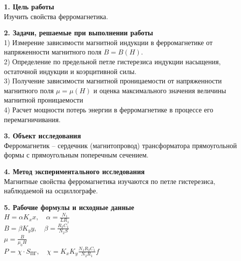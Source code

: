 \documentclass[12pt,fleqn]{article}
\begin{document}
\begin{justify}
    \textbf{1. Цель работы} \\
    Изучить свойства ферромагнетика. \\
\end{justify}

\begin{justify}
    \textbf{2. Задачи, решаемые при выполнении работы} \\
    1) Измерение зависимости магнитной индукции в ферромагнетике от напряженности магнитного поля $ B = B(H) $. \\
    2) Определение по предельной петле гистерезиса индукции насыщения, остаточной индукции и коэрцитивной силы. \\
    3) Получение зависимости магнитной проницаемости от напряженности магнитного поля $ \mu = \mu(H) $ и оценка максимального значения величины магнитной проницаемости \\
    4) Расчет мощности потерь энергии в ферромагнетике в процессе его перемагничивания. \\
\end{justify}

\begin{justify}
    \textbf{3. Объект исследования} \\
    Ферромагнетик – сердечник (магнитопровод) трансформатора прямоугольной формы с прямоугольным поперечным сечением. \\
\end{justify}

\begin{justify}
    \textbf{4. Метод экспериментального исследования} \\
    Магнитные свойства ферромагнетика изучаются по петле гистерезиса, наблюдаемой на осциллографе. \\
\end{justify}

\begin{justify}
    \textbf{5. Рабочие формулы и исходные данные} \\
    $ H = \alpha K_x x, \quad \alpha = \frac{N_1}{L R_1} $ \\
    $ B = \beta K_y y, \quad \beta = \frac{R_2 C_1}{N_2 S} $ \\
    $ \mu = \frac{B}{\mu_0 H} $ \\
    $ P = \chi \cdot S_{\text{ПГ}}, \quad \chi = K_x K_y \frac{N_1 R_2 C_1}{N_2 R_1} f $ \\
\end{justify}
\end{document}
